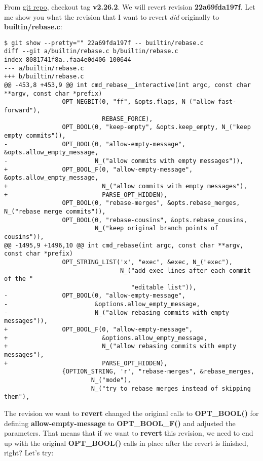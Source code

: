 From \hyperref[git_repo]{git repo}, checkout tag {\bf v2.26.2}. We will revert revision {\bf 22a69fda197f}. Let me show you what the
revision that I want to revert {\it did} originally to {\bf builtin/rebase.c}:

\begin{lstlisting}[style=console_style,
	basicstyle=\small,
	caption={\bf example 13} - Original revision]
$ git show --pretty="" 22a69fda197f -- builtin/rebase.c
diff --git a/builtin/rebase.c b/builtin/rebase.c
index 8081741f8a..faa4e0d406 100644
--- a/builtin/rebase.c
+++ b/builtin/rebase.c
@@ -453,8 +453,9 @@ int cmd_rebase__interactive(int argc, const char **argv, const char *prefix)
                OPT_NEGBIT(0, "ff", &opts.flags, N_("allow fast-forward"),
                           REBASE_FORCE),
                OPT_BOOL(0, "keep-empty", &opts.keep_empty, N_("keep empty commits")),
-               OPT_BOOL(0, "allow-empty-message", &opts.allow_empty_message,
-                        N_("allow commits with empty messages")),
+               OPT_BOOL_F(0, "allow-empty-message", &opts.allow_empty_message,
+                          N_("allow commits with empty messages"),
+                          PARSE_OPT_HIDDEN),
                OPT_BOOL(0, "rebase-merges", &opts.rebase_merges, N_("rebase merge commits")),
                OPT_BOOL(0, "rebase-cousins", &opts.rebase_cousins,
                         N_("keep original branch points of cousins")),
@@ -1495,9 +1496,10 @@ int cmd_rebase(int argc, const char **argv, const char *prefix)
                OPT_STRING_LIST('x', "exec", &exec, N_("exec"),
                                N_("add exec lines after each commit of the "
                                   "editable list")),
-               OPT_BOOL(0, "allow-empty-message",
-                        &options.allow_empty_message,
-                        N_("allow rebasing commits with empty messages")),
+               OPT_BOOL_F(0, "allow-empty-message",
+                          &options.allow_empty_message,
+                          N_("allow rebasing commits with empty messages"),
+                          PARSE_OPT_HIDDEN),
                {OPTION_STRING, 'r', "rebase-merges", &rebase_merges,
                        N_("mode"),
                        N_("try to rebase merges instead of skipping them"),
\end{lstlisting}

The revision we want to {\bf revert} changed the original calls to {\bf OPT\_BOOL()} for defining {\bf allow-empty-message}
to {\bf OPT\_BOOL\_F()} and adjusted the parameters. That means that if we want to {\bf revert} this revision, we need to end
up with the original {\bf OPT\_BOOL()} calls in place after the revert is finished, right? Let's try:

